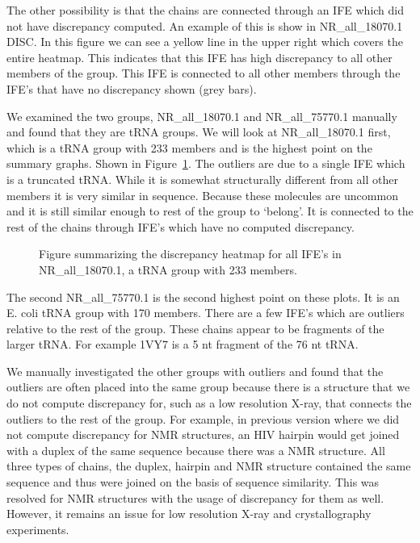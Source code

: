 The other possibility is that the chains are connected through an IFE which did
not have discrepancy computed. An example of this is show in NR\_all\_18070.1
DISC. In this figure we can see a yellow line in the upper right which covers
the entire heatmap. This indicates that this IFE has high discrepancy to all
other members of the group. This IFE is connected to all other members through
the IFE’s that have no discrepancy shown (grey bars). 

We examined the two groups, NR\_all\_18070.1 and NR\_all\_75770.1 manually and found
that they are tRNA groups. We will look at NR\_all\_18070.1 first, which is a tRNA
group with 233 members and is the highest point on the summary graphs. Shown in
Figure~\ref{fig:nr-all-18070.1-disc}. The outliers are due to a single IFE which is a
truncated tRNA. While it is somewhat structurally different from all other
members it is very similar in sequence. Because these molecules are uncommon and
it is still similar enough to rest of the group to ‘belong’. It is connected to
the rest of the chains through IFE’s which have no computed discrepancy.

\begin{figure}
  \caption{Figure summarizing the discrepancy heatmap for all IFE’s in
  NR\_all\_18070.1, a tRNA group with 233 members. }
  \label{fig:nr-all-18070.1-disc}
\end{figure}

The second NR\_all\_75770.1 is the second highest point on these plots. It is an
E. coli tRNA group with 170 members. There are a few IFE’s which are outliers
relative to the rest of the group. These chains appear to be fragments of the
larger tRNA. For example 1VY7 is a 5 nt fragment of the 76 nt tRNA. 

We manually investigated the other groups with outliers and found that the
outliers are often placed into the same group because there is a structure that
we do not compute discrepancy for, such as a low resolution X-ray, that connects
the outliers to the rest of the group. For example, in previous version where we
did not compute discrepancy for NMR structures, an HIV hairpin would get joined
with a duplex of the same sequence because there was a NMR structure. All three
types of chains, the duplex, hairpin and NMR structure contained the same
sequence and thus were joined on the basis of sequence similarity. This was
resolved for NMR structures with the usage of discrepancy for them as well.
However, it remains an issue for low resolution X-ray and crystallography
experiments. 

